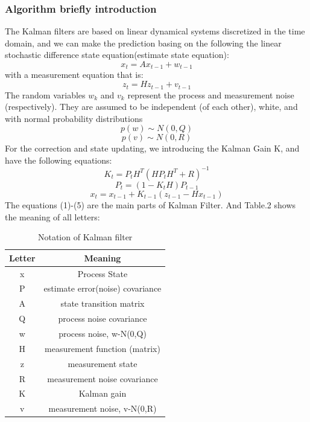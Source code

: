 \documentclass[10pt,twocolumn,letterpaper]{article}
\begin{document}
\subsubsection{Algorithm briefly introduction}
The Kalman filters are based on linear dynamical systems discretized in the time domain, and we can make the prediction basing on the following the linear stochastic difference state equation(estimate state equation):
 \begin{equation*}    
    x_t = Ax_{t-1}+w_{t-1}
    \tag{1}
\end{equation*}
with a measurement equation that is:
 \begin{equation*}    
    z_t = Hz_{t-1}+v_{t-1}
    \tag{2}
\end{equation*}
The random variables $w_k$ and $v_k$ represent the process and measurement noise (respectively). They are assumed to be independent (of each other), white, and with normal probability distributions
 \begin{equation*}    
    p(w)\sim N(0,Q)
\end{equation*}
 \begin{equation*}    
    p(v)\sim N(0,R)
\end{equation*}
For the correction and state updating, we introducing the Kalman Gain K, and have the following equations:
 \begin{equation*}    
   K_t=P_tH^T(HP_tH^T+R)^{-1}
   \tag{3}
\end{equation*}
 \begin{equation*}    
   P_t=(1-K_tH)P_{t-1}
   \tag{4}
\end{equation*}
 \begin{equation*}    
   x_t=x_{t-1}+K_{t-1}(z_{t-1}-Hx_{t-1})
   \tag{5}
\end{equation*}
The equations (1)-(5) are the main parts of Kalman Filter. And  
Table.2 shows the meaning of all letters:
\begin{table}
\begin{center}
\begin{tabular}{|c|c|}
\hline
Letter & Meaning \\
\hline\hline
x & Process State \\
\hline
P& estimate error(noise) covariance\\
\hline
A& state transition matrix\\
\hline
Q&  process noise covariance\\
\hline
w& process noise,  w-N(0,Q)\\
\hline
H&  measurement function (matrix)\\
\hline
z& measurement state \\
\hline
R& measurement noise covariance \\
\hline
K& Kalman gain \\
\hline
v& measurement noise, v-N(0,R)\\
\hline
\end{tabular}
\end{center}
\caption{Notation of Kalman filter}
\end{table}
\end{document}
